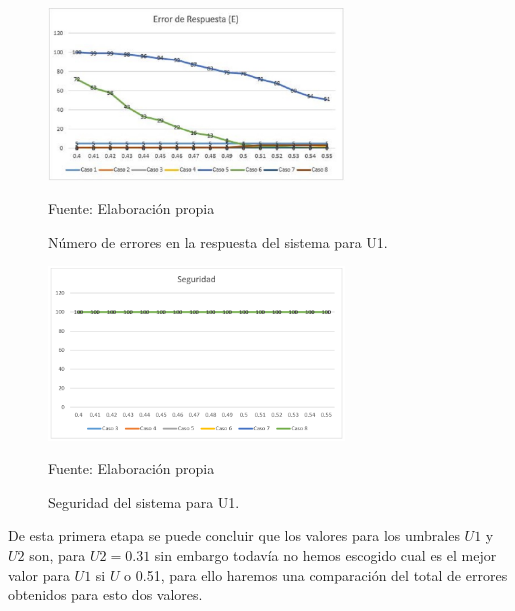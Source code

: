 \begin{figure}[H]
\begin{center}
\includegraphics[width=0.7\textwidth]{Imagenes/Cap4/image003}
\end{center}
\begin{center}
\vskip -0.5cm
\caption{\small{Número de errores en la respuesta del sistema para U1.}}
\label{fig:figura4.3}
{\small{Fuente: Elaboración propia}}
\end{center}
\end{figure}

\begin{figure}[H]
\begin{center}
\includegraphics[width=0.7\textwidth]{Imagenes/Cap4/image004}
\end{center}
\begin{center}
\vskip -0.5cm
\caption{\small{Seguridad del sistema para U1.}}
\label{fig:figura4.4}
{\small{Fuente: Elaboración propia}}
\end{center}
\end{figure}

\vskip 0.5cm
De esta primera etapa se puede concluir que los valores para los umbrales $U1$ y $U2$ son, para $U2 = 0.31$ sin embargo todavía no hemos escogido cual es el mejor valor para $U1$ si $U$ o 0.51, para ello haremos una comparación del total de errores obtenidos para esto dos valores.

